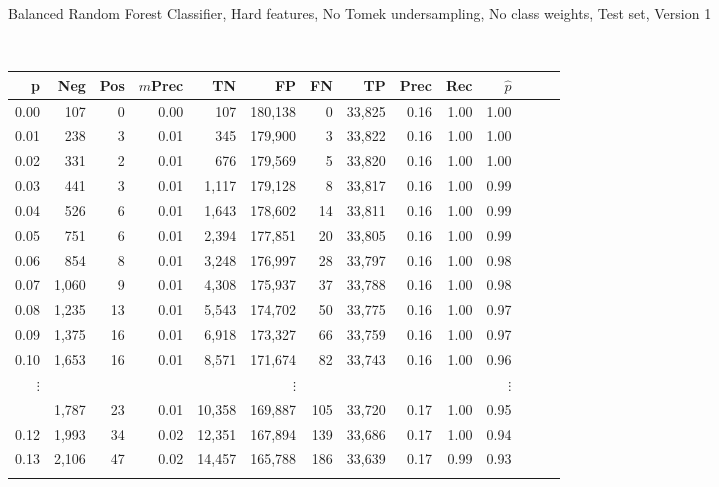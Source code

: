 \newpage


\noindent Balanced Random Forest Classifier, Hard features, No Tomek undersampling, No class weights, Test set, Version 1

\

\hfil\begin{tabular}{rrrrrrrrrrrrrr}
\toprule
p &    Neg &  Pos & $m$Prec &       TN &       FP &      FN &      TP &  Prec &   Rec & $\hat{p}$ \\
\midrule
0.00 &    107 &    0 &  0.00 &      107 &  180,138 &       0 &  33,825 &  0.16 &  1.00 &      1.00 \\
0.01 &    238 &    3 &  0.01 &      345 &  179,900 &       3 &  33,822 &  0.16 &  1.00 &      1.00 \\
0.02 &    331 &    2 &  0.01 &      676 &  179,569 &       5 &  33,820 &  0.16 &  1.00 &      1.00 \\
0.03 &    441 &    3 &  0.01 &    1,117 &  179,128 &       8 &  33,817 &  0.16 &  1.00 &      0.99 \\
0.04 &    526 &    6 &  0.01 &    1,643 &  178,602 &      14 &  33,811 &  0.16 &  1.00 &      0.99 \\
0.05 &    751 &    6 &  0.01 &    2,394 &  177,851 &      20 &  33,805 &  0.16 &  1.00 &      0.99 \\
0.06 &    854 &    8 &  0.01 &    3,248 &  176,997 &      28 &  33,797 &  0.16 &  1.00 &      0.98 \\
0.07 &  1,060 &    9 &  0.01 &    4,308 &  175,937 &      37 &  33,788 &  0.16 &  1.00 &      0.98 \\
0.08 &  1,235 &   13 &  0.01 &    5,543 &  174,702 &      50 &  33,775 &  0.16 &  1.00 &      0.97 \\
0.09 &  1,375 &   16 &  0.01 &    6,918 &  173,327 &      66 &  33,759 &  0.16 &  1.00 &      0.97 \\
0.10 &  1,653 &   16 &  0.01 &    8,571 &  171,674 &      82 &  33,743 &  0.16 &  1.00 &      0.96 \\
$\vdots$ &&&&& $\vdots$ &&&&& $\vdots$ \\
\begin{comment}
0.11 &  1,787 &   23 &  0.01 &   10,358 &  169,887 &     105 &  33,720 &  0.17 &  1.00 &      0.95 \\
0.12 &  1,993 &   34 &  0.02 &   12,351 &  167,894 &     139 &  33,686 &  0.17 &  1.00 &      0.94 \\
0.13 &  2,106 &   47 &  0.02 &   14,457 &  165,788 &     186 &  33,639 &  0.17 &  0.99 &      0.93 \\

\end{comment}
\end{tabular}

